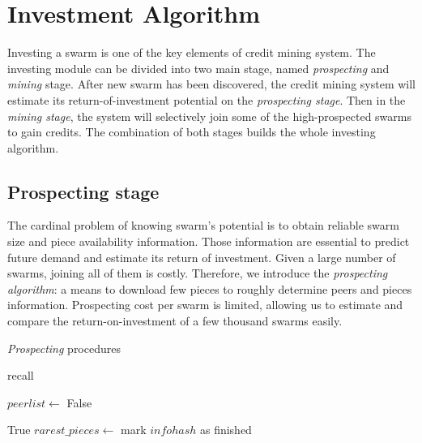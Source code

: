 \chapter{Investment Algorithm}
\label{chapter:prospection}
Investing a swarm is one of the key elements of credit mining system. The investing module can be divided into two main stage, named \textit{prospecting} and \textit{mining} stage. After new swarm has been discovered, the credit mining system will estimate its return-of-investment potential on the \textit{prospecting stage}. Then in the \textit{mining stage}, the system will selectively join some of the high-prospected swarms to gain credits. The combination of both stages builds the whole investing algorithm. 

\section{Prospecting stage}
The cardinal problem of knowing swarm's potential is to obtain reliable swarm size and piece availability information. Those information are essential to predict future demand and estimate its return of investment. Given a large number of swarms, joining all of them is costly. Therefore, we introduce the \textit{prospecting algorithm}: a means to download few pieces to roughly determine peers and pieces information. Prospecting cost per swarm is limited, allowing us to estimate and compare the return-on-investment of a few thousand swarms easily.

\begin{algorithm}[h!]
	\caption{\textit{Prospecting} procedures}
	\label{alg:prospectg}
	\begin{algorithmic}[1]
		\State recall 
		\EndIf
		\State {}
		\State {}
		\State {}
		\State \Return {}
		\EndFunction
		
		\Statex
		\State $peerlist \gets$ 
		\State {}
		\State {}
		\State \Return False
		\EndIf
		
		\State {}
		\State \Return True
		\EndIf
		\State $rarest\_pieces \gets$  \label{alg:prospectg:callrarepc}
			\State {}
		\EndFor
		\State mark $infohash$ as finished
		\EndIf
		\State \Return {}
		\EndFunction		
	\end{algorithmic}
\end{algorithm}

